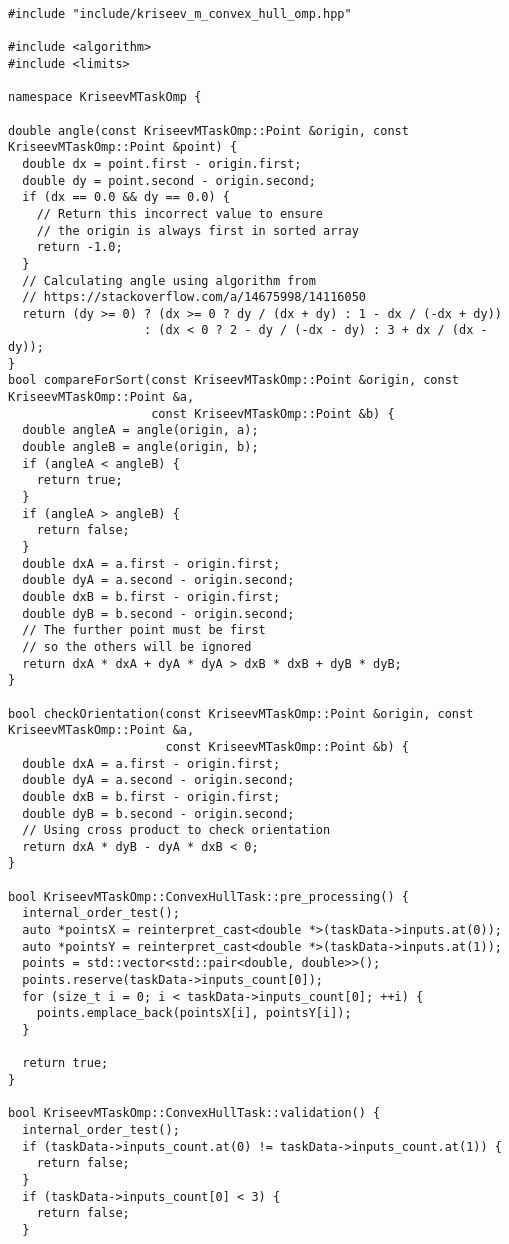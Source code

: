 \documentclass[a4paper,12pt]{article}
\begin{document}
\begin{lstlisting}
#include "include/kriseev_m_convex_hull_omp.hpp"

#include <algorithm>
#include <limits>

namespace KriseevMTaskOmp {

double angle(const KriseevMTaskOmp::Point &origin, const KriseevMTaskOmp::Point &point) {
  double dx = point.first - origin.first;
  double dy = point.second - origin.second;
  if (dx == 0.0 && dy == 0.0) {
    // Return this incorrect value to ensure
    // the origin is always first in sorted array
    return -1.0;
  }
  // Calculating angle using algorithm from
  // https://stackoverflow.com/a/14675998/14116050
  return (dy >= 0) ? (dx >= 0 ? dy / (dx + dy) : 1 - dx / (-dx + dy))
                   : (dx < 0 ? 2 - dy / (-dx - dy) : 3 + dx / (dx - dy));
}
bool compareForSort(const KriseevMTaskOmp::Point &origin, const KriseevMTaskOmp::Point &a,
                    const KriseevMTaskOmp::Point &b) {
  double angleA = angle(origin, a);
  double angleB = angle(origin, b);
  if (angleA < angleB) {
    return true;
  }
  if (angleA > angleB) {
    return false;
  }
  double dxA = a.first - origin.first;
  double dyA = a.second - origin.second;
  double dxB = b.first - origin.first;
  double dyB = b.second - origin.second;
  // The further point must be first
  // so the others will be ignored
  return dxA * dxA + dyA * dyA > dxB * dxB + dyB * dyB;
}

bool checkOrientation(const KriseevMTaskOmp::Point &origin, const KriseevMTaskOmp::Point &a,
                      const KriseevMTaskOmp::Point &b) {
  double dxA = a.first - origin.first;
  double dyA = a.second - origin.second;
  double dxB = b.first - origin.first;
  double dyB = b.second - origin.second;
  // Using cross product to check orientation
  return dxA * dyB - dyA * dxB < 0;
}

bool KriseevMTaskOmp::ConvexHullTask::pre_processing() {
  internal_order_test();
  auto *pointsX = reinterpret_cast<double *>(taskData->inputs.at(0));
  auto *pointsY = reinterpret_cast<double *>(taskData->inputs.at(1));
  points = std::vector<std::pair<double, double>>();
  points.reserve(taskData->inputs_count[0]);
  for (size_t i = 0; i < taskData->inputs_count[0]; ++i) {
    points.emplace_back(pointsX[i], pointsY[i]);
  }

  return true;
}

bool KriseevMTaskOmp::ConvexHullTask::validation() {
  internal_order_test();
  if (taskData->inputs_count.at(0) != taskData->inputs_count.at(1)) {
    return false;
  }
  if (taskData->inputs_count[0] < 3) {
    return false;
  }


\end{lstlisting}
\end{document}
